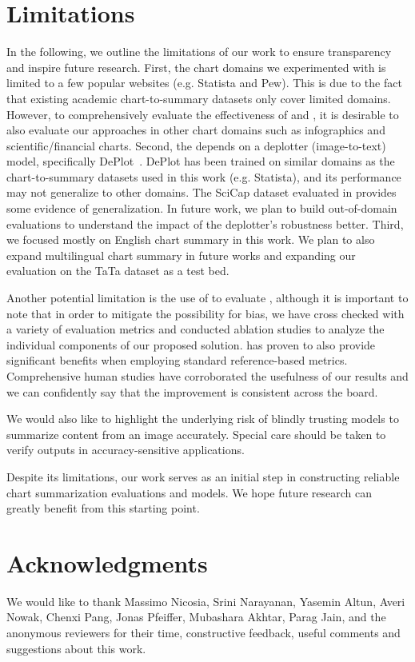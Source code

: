 \section*{Limitations}

In the following, we outline the limitations of our work to ensure transparency and inspire future research.
First, the chart domains we experimented with is limited to a few popular websites (e.g. Statista and Pew). This is due to the fact that existing academic chart-to-summary datasets only cover limited domains. However, to comprehensively evaluate the effectiveness of \metric{} and \pipeline{}, it is desirable to also evaluate our approaches in other chart domains such as infographics and scientific/financial charts.
Second, the \metric{} depends on a deplotter (image-to-text) model, specifically DePlot~\cite{liu-etal-2023-deplot}. DePlot has been trained on similar domains as the chart-to-summary datasets used in this work (e.g. Statista), and its performance may not generalize to other domains. The SciCap dataset evaluated in  provides some evidence of generalization. 
In future work, we plan to build out-of-domain evaluations to understand the impact of the deplotter's robustness better.
Third, we focused mostly on English chart summary in this work. We plan to also expand multilingual chart summary in future works and expanding our evaluation on the TaTa dataset \citep{gehrmann2022tata} as a test bed.

Another potential limitation is the use of \metric{} to evaluate \pipeline{}, although it is important to note that in order to mitigate the possibility for bias, we have cross checked with a variety of evaluation metrics and conducted ablation studies to analyze the individual components of our proposed solution. 
\pipeline{} has proven to also provide significant benefits when employing standard reference-based metrics. 
Comprehensive human studies have corroborated the usefulness of our results and we can confidently say that the improvement is consistent across the board.

We would also like to highlight the underlying risk of blindly trusting models to summarize content from an image accurately. Special care should be taken to verify outputs in accuracy-sensitive applications.

Despite its limitations, our work serves as an initial step in constructing reliable chart summarization evaluations and models. We hope future research can greatly benefit from this starting point.

\section*{Acknowledgments}
We would like to thank Massimo Nicosia,
Srini Narayanan, 
Yasemin Altun,
Averi Nowak,
Chenxi Pang,
Jonas Pfeiffer,
Mubashara Akhtar,
Parag Jain,
and the anonymous reviewers for their time, constructive feedback, useful
comments and suggestions about this work.
